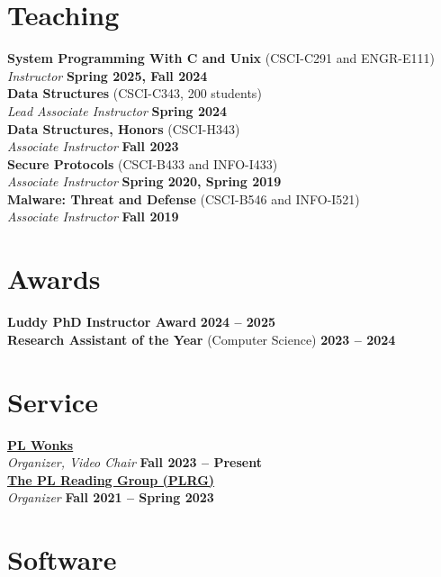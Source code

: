 \section*{\sc Teaching}

{\bf System Programming With C and Unix} (CSCI-C291 and ENGR-E111) \\
{\em Instructor} \hfill {\bf Spring 2025, Fall 2024} \\
{\bf Data Structures} (CSCI-C343, 200 students) \\
{\em Lead Associate Instructor} \hfill {\bf Spring 2024} \\
{\bf Data Structures, Honors} (CSCI-H343) \\
{\em Associate Instructor} \hfill {\bf Fall 2023} \\
{\bf Secure Protocols} (CSCI-B433 and INFO-I433) \\
{\em Associate Instructor} \hfill {\bf Spring 2020, Spring 2019} \\
{\bf Malware: Threat and Defense} (CSCI-B546 and INFO-I521) \\
{\em Associate Instructor} \hfill {\bf Fall 2019} \\

\section*{\sc Awards}

{\bf Luddy PhD Instructor Award}
\hfill {\bf 2024 -- 2025} \\
{\bf Research Assistant of the Year} (Computer Science)
\hfill {\bf 2023 -- 2024} \\

\section*{\sc Service}

{\bf \href{https://wonks.github.io/}{PL Wonks}} \\
{\em Organizer, Video Chair} \hfill {\bf Fall 2023 -- Present} \\
{\bf \href{https://wonks.github.io/plrg/}{The PL Reading Group (PLRG)}} \\
{\em Organizer} \hfill {\bf Fall 2021 -- Spring 2023}

\section*{\sc Software}


